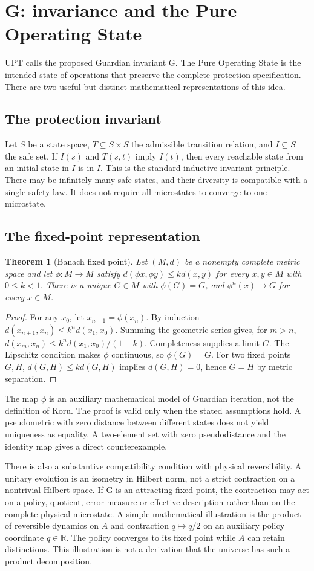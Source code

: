 \documentclass[11pt,a4paper]{article}
\newtheorem{theorem}{Theorem}[section]\newtheorem{proposition}[theorem]{Proposition}\newtheorem{definition}[theorem]{Definition}\newtheorem{example}[theorem]{Example}
\begin{document}
\section{G: invariance and the Pure Operating State}
UPT calls the proposed Guardian invariant G. The Pure Operating State is the intended state of operations that preserve the complete protection specification. There are two useful but distinct mathematical representations of this idea.
\subsection{The protection invariant}
Let $S$ be a state space, $T\subseteq S\times S$ the admissible transition relation, and $I\subseteq S$ the safe set. If $I(s)$ and $T(s,t)$ imply $I(t)$, then every reachable state from an initial state in $I$ is in $I$. This is the standard inductive invariant principle. There may be infinitely many safe states, and their diversity is compatible with a single safety law. It does not require all microstates to converge to one microstate.
\subsection{The fixed-point representation}
\begin{theorem}[Banach fixed point]\label{thm:banach}
Let $(M,d)$ be a nonempty complete metric space and let $\phi:M\to M$ satisfy $d(\phi x,\phi y)\leq k d(x,y)$ for every $x,y\in M$ with $0\leq k<1$. There is a unique $G\in M$ with $\phi(G)=G$, and $\phi^n(x)\to G$ for every $x\in M$.
\end{theorem}
\begin{proof} For any $x_0$, let $x_{n+1}=\phi(x_n)$. By induction $d(x_{n+1},x_n)\leq k^n d(x_1,x_0)$. Summing the geometric series gives, for $m>n$, $d(x_m,x_n)\leq k^n d(x_1,x_0)/(1-k)$. Completeness supplies a limit $G$. The Lipschitz condition makes $\phi$ continuous, so $\phi(G)=G$. For two fixed points $G,H$, $d(G,H)\leq k d(G,H)$ implies $d(G,H)=0$, hence $G=H$ by metric separation.\end{proof}
The map $\phi$ is an auxiliary mathematical model of Guardian iteration, not the definition of Koru. The proof is valid only when the stated assumptions hold. A pseudometric with zero distance between different states does not yield uniqueness as equality. A two-element set with zero pseudodistance and the identity map gives a direct counterexample.

There is also a substantive compatibility condition with physical reversibility. A unitary evolution is an isometry in Hilbert norm, not a strict contraction on a nontrivial Hilbert space. If G is an attracting fixed point, the contraction may act on a policy, quotient, error measure or effective description rather than on the complete physical microstate. A simple mathematical illustration is the product of reversible dynamics on $A$ and contraction $q\mapsto q/2$ on an auxiliary policy coordinate $q\in\mathbb R$. The policy converges to its fixed point while $A$ can retain distinctions. This illustration is not a derivation that the universe has such a product decomposition.
\end{document}
